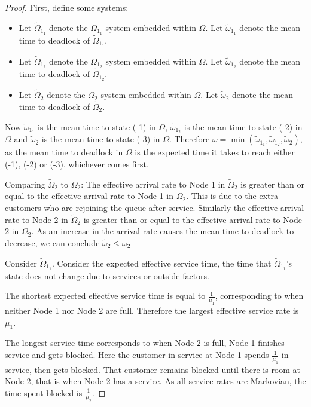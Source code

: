 \documentclass{article}
\begin{document}
\begin{proof}
First, define some systems:
\begin{itemize}
  \item Let $\widetilde{\Omega}_{1_1}$ denote the $\Omega_{1_1}$ system embedded within $\Omega$. Let $\widetilde{\omega}_{1_1}$ denote the mean time to deadlock of $\widetilde{\Omega}_{1_1}$.
  \item Let $\widetilde{\Omega}_{1_2}$ denote the $\Omega_{1_2}$ system embedded within $\Omega$. Let $\widetilde{\omega}_{1_2}$ denote the mean time to deadlock of $\widetilde{\Omega}_{1_2}$.
  \item Let $\widetilde{\Omega}_2$ denote the $\Omega_2$ system embedded within $\Omega$. Let $\widetilde{\omega}_2$ denote the mean time to deadlock of $\widetilde{\Omega}_2$.
\end{itemize}

Now $\widetilde{\omega}_{1_1}$ is the mean time to state (-1) in $\Omega$, $\widetilde{\omega}_{1_2}$ is the mean time to state (-2) in $\Omega$ and $\widetilde{\omega}_2$ is the mean time to state (-3) in $\Omega$.
Therefore $\omega = \min(\widetilde{\omega}_{1_1}, \widetilde{\omega}_{1_2}, \widetilde{\omega}_2)$, as the mean time to deadlock in $\Omega$ is the expected time it takes to reach either (-1), (-2) or (-3), whichever comes first.

Comparing $\widetilde{\Omega}_2$ to $\Omega_2$:
The effective arrival rate to Node 1 in $\widetilde{\Omega}_2$ is greater than or equal to the effective arrival rate to Node 1 in $\Omega_2$.
This is due to the extra customers who are rejoining the queue after service.
Similarly the effective arrival rate to Node 2 in $\widetilde{\Omega}_2$ is greater than or equal to the effective arrival rate to Node 2 in $\Omega_2$.
As an increase in the arrival rate causes the mean time to deadlock to decrease, we can conclude $\widetilde{\omega}_2 \leq \omega_2$

Consider $\widetilde{\Omega}_{1_1}$.
Consider the expected effective service time, the time that $\widetilde{\Omega}_{1_1}$'s state does not change due to services or outside factors.

The shortest expected effective service time is equal to $\frac{1}{\mu_1}$, corresponding to when neither Node 1 nor Node 2 are full.
Therefore the largest effective service rate is $\mu_1$.

The longest service time corresponds to when Node 2 is full, Node 1 finishes service and gets blocked.
Here the customer in service at Node 1 spends $\frac{1}{\mu_1}$ in service, then gets blocked.
That customer remains blocked until there is room at Node 2, that is when Node 2 has a service.
As all service rates are Markovian, the time spent blocked is $\frac{1}{\mu_2}$.


\end{proof}
\end{document}
